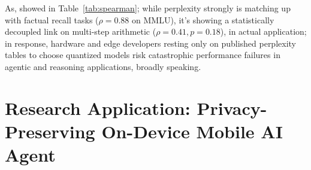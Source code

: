 \documentclass[12pt,a4paper,oneside]{report}
\begin{document}
    \begin{table}[h!]
    \centering
    \caption{Spearman Rank Correlation ($\rho$) Between $\Delta\text{PPL}$ and $\Delta\text{Acc}$}
    \label{tab:spearman}
    \renewcommand{\arraystretch}{1.2}
    \end{table}

    As, showed in Table~\ref{tab:spearman}; while perplexity strongly is matching up with factual recall tasks ($\rho = 0.88$ on MMLU), it's showing a statistically decoupled link on multi-step arithmetic ($\rho = 0.41, p = 0.18$), in actual application; in response, hardware and edge developers resting only on published perplexity tables to choose quantized models risk catastrophic performance failures in agentic and reasoning applications, broadly speaking.

    \chapter{Research Application: Privacy-Preserving On-Device Mobile AI Agent}
\end{document}
